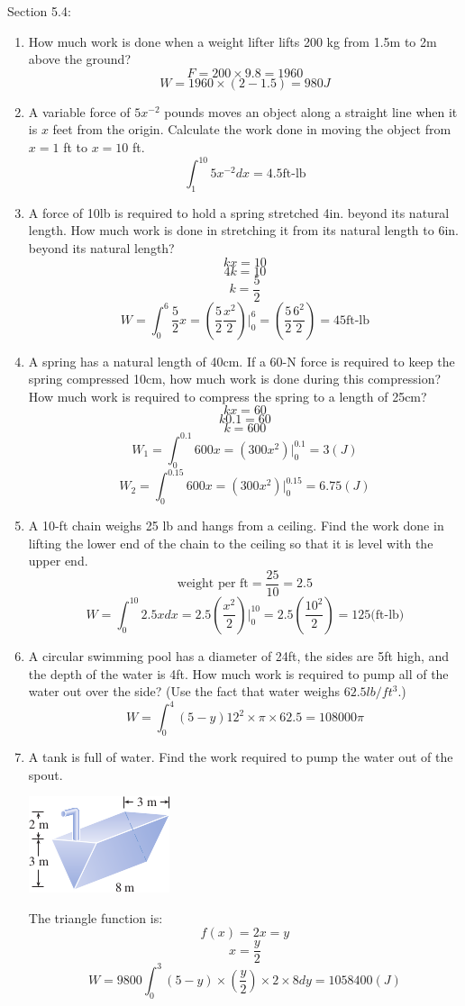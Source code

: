 \documentclass[12pt]{article}
\begin{document}
Section 5.4:

\begin{enumerate}
    \item How much work is done when a weight lifter lifts 200 kg from 1.5m to 2m above the ground?
    \[F = 200\times9.8 = 1960\]
    \[W = 1960 \times (2-1.5) = 980J\]
\setcounter{enumi}{2}
    \item A variable force of $5x^{-2}$ pounds moves an object along a straight line when it is $x$ feet from the origin. Calculate the work done in moving the object from $x=1$ ft to $x=10$ ft.
    \[\int_{1}^{10}5x^{-2}dx = 4.5\text{ft-lb}\]
\setcounter{enumi}{6}
    \item A force of 10lb is required to hold a spring stretched 4in. beyond its natural length. How much work is done in stretching it from its natural length to 6in. beyond its natural length?
    \[kx = 10\]
    \[4k = 10\]
    \[k = \frac{5}{2}\]
    \[W = \int_0^6 \frac{5}{2}x = (\frac{5}{2}\frac{x^2}{2})|_0^6 = (\frac{5}{2}\frac{6^2}{2}) = 45\text{ft-lb}\]
    \item A spring has a natural length of 40cm. If a 60-N force is required to keep the spring compressed 10cm, how much work is done during this compression? How much work is required to compress the spring to a length of 25cm?
    \[kx = 60\]
    \[k0.1 = 60\]
    \[k = 600\]
    \[W_1 = \int_{0}^{0.1}600x = (300x^2)|^{0.1}_0 = 3(J)\]
    \[W_2 = \int_{0}^{0.15}600x = (300x^2)|^{0.15}_0 = 6.75(J)\]

\setcounter{enumi}{16}
    \item A 10-ft chain weighs 25 lb and hangs from a ceiling. Find the work done in lifting the lower end of the chain to the ceiling so that it is level with the upper end.
    \[\text{weight per ft} = \frac{25}{10} = 2.5\]
    \[W = \int_{0}^{10} 2.5x dx = 2.5(\frac{x^2}{2})|_0^{10} = 2.5(\frac{10^2}{2}) = 125\text{(ft-lb)}\]

\setcounter{enumi}{19}
    \item A circular swimming pool has a diameter of 24ft, the sides are 5ft high, and the depth of the water is 4ft. How much work is required to pump all of the water out over the side? (Use the fact that water weighs $62.5lb/ft^3$.)
    \[W = \int_{0}^{4}(5-y)12^2\times\pi\times62.5 = 108000\pi\]

\setcounter{enumi}{22}
    \item A tank is full of water. Find the work required to pump the water out of the spout. 
    \begin{center}
        \includegraphics{img/img-1.png}
    \end{center}
    The triangle function is:
    \[f(x) = 2x = y\]
    \[x = \frac{y}{2}\]
    \[W = 9800\int_{0}^{3}(5-y) \times (\frac{y}{2})\times 2 \times 8dy = 1058400(J)\]
\end{enumerate}
\end{document}
